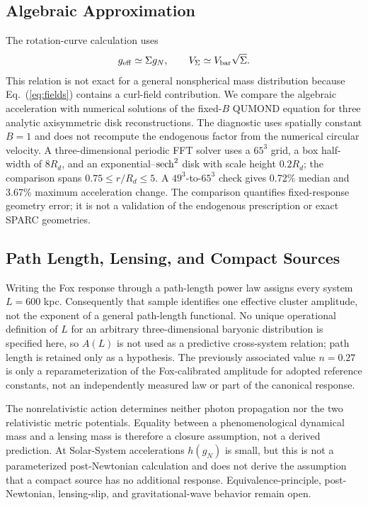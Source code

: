 \documentclass[aps,prd,reprint,superscriptaddress,showpacs,floatfix,longbibliography]{revtex4-2}
\begin{document}
\subsection{Algebraic Approximation}

The rotation-curve calculation uses
\begin{equation}
g_{\rm eff}\simeq\Sigma g_N,\qquad
V_\Sigma\simeq V_{\rm bar}\sqrt{\Sigma}.
\label{eq:algebraic}
\end{equation}
This relation is not exact for a general nonspherical mass distribution because Eq.~(\ref{eq:fields}) contains a curl-field contribution. We compare the algebraic acceleration with numerical solutions of the fixed-$B$ QUMOND equation for three analytic axisymmetric disk reconstructions. The diagnostic uses spatially constant $B=1$ and does not recompute the endogenous factor from the numerical circular velocity. A three-dimensional periodic FFT solver uses a $65^3$ grid, a box half-width of $8R_d$, and an exponential--${\rm sech}^2$ disk with scale height $0.2R_d$; the comparison spans $0.75\le r/R_d\le5$. A $49^3$-to-$65^3$ check gives 0.72\% median and 3.67\% maximum acceleration change. The comparison quantifies fixed-response geometry error; it is not a validation of the endogenous prescription or exact SPARC geometries.

\subsection{Path Length, Lensing, and Compact Sources}

Writing the Fox response through a path-length power law assigns every system $L=600$ kpc. Consequently that sample identifies one effective cluster amplitude, not the exponent of a general path-length functional. No unique operational definition of $L$ for an arbitrary three-dimensional baryonic distribution is specified here, so $A(L)$ is not used as a predictive cross-system relation; path length is retained only as a hypothesis. The previously associated value $n=0.27$ is only a reparameterization of the Fox-calibrated amplitude for adopted reference constants, not an independently measured law or part of the canonical response.

The nonrelativistic action determines neither photon propagation nor the two relativistic metric potentials. Equality between a phenomenological dynamical mass and a lensing mass is therefore a closure assumption, not a derived prediction. At Solar-System accelerations $h(g_N)$ is small, but this is not a parameterized post-Newtonian calculation and does not derive the assumption that a compact source has no additional response. Equivalence-principle, post-Newtonian, lensing-slip, and gravitational-wave behavior remain open.
\end{document}
